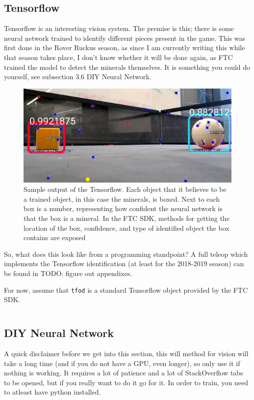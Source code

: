 \documentclass[../main.tex]{subfiles}
\begin{document}
\subsection{Tensorflow}
Tensorflow is an interesting vision system. The premise is this; there is some neural network trained to identify different pieces present in the game. This was first done in the Rover Ruckus season, as since I am currently writing this while that season takes place, I don't know whether it will be done again, as FTC trained the model to detect the minerals themselves. It is something you could do yourself, see subsection 3.6 DIY Neural Network. 
\begin{figure}[H]
    \includegraphics[width=400pt]{sections/vision/images/tensorflowOutput.png}
    \caption{Sample output of the Tensorflow. Each object that it believes to be a trained object, in this case the minerals, is boxed. Next to each box is a number, representing how confident the neural network is that the box is a mineral. In the FTC SDK, methods for getting the location of the box, confidence, and type of identified object the box contains are exposed}
\end{figure}

So, what does this look like from a programming standpoint? A full teleop which implements the Tensorflow identification (at least for the 2018-2019 season) can be found in TODO: figure out appendixes.

For now, assume that \verb|tfod| is a standard Tensorflow object provided by the FTC SDK.

\begin{lstlisting}[language=Java]
\end{lstlisting}

\subsection{DIY Neural Network}
A quick disclaimer before we get into this section, this will method for vision will take a long time (and if you do not have a GPU, even longer), so only use it if nothing is working. It requires a lot of patience and a lot of StackOverflow tabs to be opened, but if you really want to do it go for it. In order to train, you need to atleast have python installed.
\end{document}
